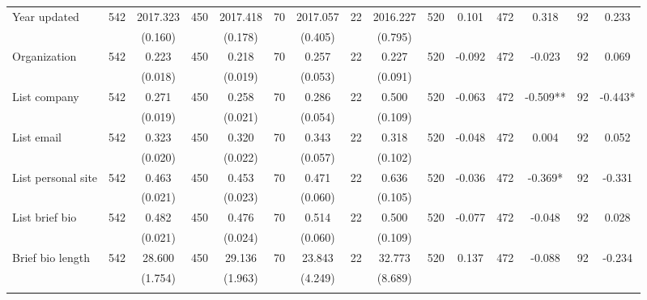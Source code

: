 \begin{tabular}{@{\extracolsep{5pt}}lcccccccccccccc}
Year updated   & 542    & 2017.323    & 450    & 2017.418    & 70    & 2017.057    & 22    & 2016.227    & 520    & 0.101    & 472    & 0.318    & 92    & 0.233   \\
 &   & (0.160)  &   & (0.178)  &   & (0.405)  &   & (0.795)  &   &  &   &  &   &  \\ [1ex]
Organization   & 542    & 0.223    & 450    & 0.218    & 70    & 0.257    & 22    & 0.227    & 520    & -0.092    & 472    & -0.023    & 92    & 0.069   \\
 &   & (0.018)  &   & (0.019)  &   & (0.053)  &   & (0.091)  &   &  &   &  &   &  \\ [1ex]
List company   & 542    & 0.271    & 450    & 0.258    & 70    & 0.286    & 22    & 0.500    & 520    & -0.063    & 472    & -0.509**    & 92    & -0.443*   \\
 &   & (0.019)  &   & (0.021)  &   & (0.054)  &   & (0.109)  &   &  &   &  &   &  \\ [1ex]
List email   & 542    & 0.323    & 450    & 0.320    & 70    & 0.343    & 22    & 0.318    & 520    & -0.048    & 472    & 0.004    & 92    & 0.052   \\
 &   & (0.020)  &   & (0.022)  &   & (0.057)  &   & (0.102)  &   &  &   &  &   &  \\ [1ex]
List personal site   & 542    & 0.463    & 450    & 0.453    & 70    & 0.471    & 22    & 0.636    & 520    & -0.036    & 472    & -0.369*    & 92    & -0.331   \\
 &   & (0.021)  &   & (0.023)  &   & (0.060)  &   & (0.105)  &   &  &   &  &   &  \\ [1ex]
List brief bio   & 542    & 0.482    & 450    & 0.476    & 70    & 0.514    & 22    & 0.500    & 520    & -0.077    & 472    & -0.048    & 92    & 0.028   \\
 &   & (0.021)  &   & (0.024)  &   & (0.060)  &   & (0.109)  &   &  &   &  &   &  \\ [1ex]
Brief bio length   & 542    & 28.600    & 450    & 29.136    & 70    & 23.843    & 22    & 32.773    & 520    & 0.137    & 472    & -0.088    & 92    & -0.234   \\
 &   & (1.754)  &   & (1.963)  &   & (4.249)  &   & (8.689)  &   &  &   &  &   &  \\ [1ex]
\hline \hline \\[-1.8ex]

\end{tabular}
